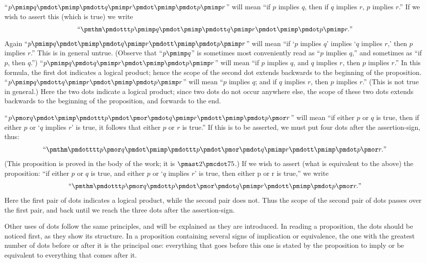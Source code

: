 \documentclass[letterpaper,12pt,openany,leqno]{book}
\newcommand{\pagefirst}[1]{\marginnote[\boxed{\text{#1}}]{\boxed{\text{#1}}}}
\begin{document}
``$p \pmimp q \pmdot \pmimp \pmdott q \pmimp r \pmdot \pmimp \pmdot p \pmimp r$'' will mean ``if $p$ implies $q$, then if $q$ implies $r$, $p$ implies $r$.'' If we wish to assert this (which is true) we write
\[
	\text{``}\pmthm \pmdottt p \pmimp q \pmdot \pmimp \pmdott q \pmimp r \pmdot \pmimp \pmdot p \pmimp r.\text{''}
\]
Again ``$p \pmimp q \pmdot \pmimp \pmdot q \pmimp r \pmdott \pmimp \pmdot p \pmimp r$'' will mean ``if `$p$ implies $q$' implies `$q$ implies $r$,' then $p$ implies $r$.'' This is in general untrue. (Observe that ``$p \pmimp q$'' is sometimes most conveniently read as ``$p$ implies $q$,'' and sometimes as ``if $p$, then $q$.'') ``$p \pmimp q \pmdot q \pmimp r \pmdot \pmimp \pmdot p \pmimp r$'' will mean ``if $p$ implies $q$, and $q$ implies $r$, then $p$ implies $r$.'' In this formula, the first dot indicates a logical product; hence the scope of the second dot extends backwards to the  beginning of the proposition. ``$p \pmimp q \pmdott q \pmimp  r \pmdot \pmimp \pmdot p \pmimp r$'' will mean ``$p$ implies $q$; and if $q$ implies $r$, then $p$ implies $r$.'' (This is not true in general.) Here the two dots indicate a logical product; since two dots do not occur anywhere else, the scope of these two dots extends backwards to the beginning of the proposition, and forwards to the end.

``$p \pmor q \pmdot \pmimp \pmdottt p \pmdot \pmor \pmdot q \pmimp r \pmdott \pmimp \pmdot p \pmor r$'' will mean ``if either $p$ or $q$ is true, then if either $p$ or `$q$ implies $r$' is true, it follows that either $p$ or $r$ is true.'' \pagefirst{11} If this is to be asserted, we must put four dots after the assertion-sign, thus:
\[
	\text{``}\pmthm \pmdotttt p \pmor q \pmdot \pmimp \pmdottt p \pmdot \pmor \pmdot q \pmimp r \pmdott \pmimp \pmdot p \pmor r.\text{''} 
\]
(This proposition is proved in the body of the work; it is $\pmast2\pmcdot75$.) If we wish to assert (what is equivalent to the above) the proposition: ``if either $p$ or $q$ is true, and either $p$ or `$q$ implies $r$' is true, then either p or r is true,'' we  write
\[
	\text{``}\pmthm \pmdottt p \pmor q \pmdott p \pmdot \pmor \pmdot q \pmimp r \pmdott \pmimp \pmdot p \pmor r.\text{''}
\]
Here the first pair of dots indicates a logical product, while the second pair does not. Thus the scope of the second pair of dots passes over the first pair, and back until we reach the three dots after the assertion-sign. 

Other uses of dots follow the same principles, and will be explained as they are introduced. In reading a proposition, the dots should be noticed first, as they show its structure. In a proposition containing several signs of implication or equivalence, the one with the greatest number of dots before or after it is the principal one: everything that goes before this one is stated by the proposition to imply or be equivalent to everything that comes after it.
\end{document}
